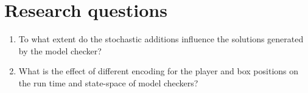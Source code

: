 \section{Research questions}
\begin{enumerate}
    \item To what extent do the stochastic additions influence the solutions generated by the model checker?
    \item What is the effect of different encoding for the player and box positions on the run time and state-space of model checkers?
\end{enumerate}